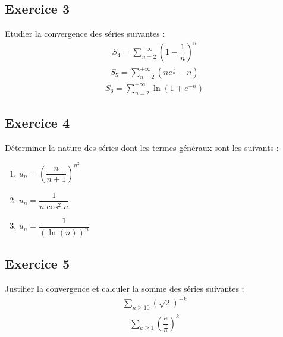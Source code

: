 \documentclass[letterpaper,10pt,french]{sphinxmanual}
\begin{document}
\subsection{Exercice 3}
\label{\detokenize{exo4:exercice-3}}
\sphinxAtStartPar
Etudier la convergence des séries suivantes :
\begin{equation*}
\begin{split}
S_4 = \sum_{n=2}^{+\infty} (1-\dfrac{1}{n})^n
\end{split}
\end{equation*}\begin{equation*}
\begin{split}
S_5 = \sum_{n=2}^{+\infty} (ne^\frac{1}{n}-n)
\end{split}
\end{equation*}\begin{equation*}
\begin{split}
S_6 = \sum_{n=2}^{+\infty} \ln (1+e^{-n})
\end{split}
\end{equation*}

\subsection{Exercice 4}
\label{\detokenize{exo4:exercice-4}}
\sphinxAtStartPar
Déterminer la nature des séries dont les termes généraux sont les suivants :
\begin{enumerate}
%
\item {} 
\sphinxAtStartPar
\(u_n = \left(\dfrac{n}{n+1}\right)^{n^2}\)

\item {} 
\sphinxAtStartPar
\(u_n = \dfrac{1}{n\cos ^2 n}\)

\item {} 
\sphinxAtStartPar
\(u_n = \dfrac{1}{(\ln(n))^n}\)

\end{enumerate}


\subsection{Exercice 5}
\label{\detokenize{exo4:exercice-5}}
\sphinxAtStartPar
Justifier la convergence et calculer la somme des séries suivantes :
\begin{equation*}
\begin{split}
\sum_{n\geq 10}(\sqrt{2})^{-k}
\end{split}
\end{equation*}\begin{equation*}
\begin{split}
\sum_{k\geq 1}(\dfrac{e}{\pi})^k
\end{split}
\end{equation*}
\end{document}
